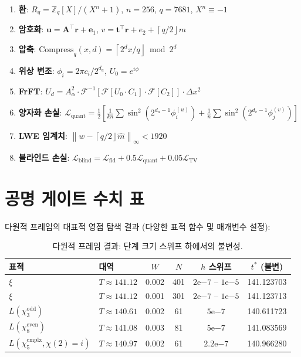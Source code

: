\documentclass[11pt, a4paper]{article}
\theoremstyle{definition}
\theoremstyle{plain}
\newcommand{\Rq}{\mathbb{Z}_q[X]/(X^n+1)}
\newcommand{\norm}[1]{\left\|#1\right\|}
\newcommand{\ceil}[1]{\left\lceil#1\right\rfloor}
\newcommand{\xif}{\xi}
\begin{document}
\begin{enumerate}
  \item \textbf{환}: $R_q = \Rq$, $n=256$, $q=7681$, $X^n \equiv -1$
  \item \textbf{암호화}: $\mathbf{u} = \mathbf{A}^\top\mathbf{r}+\mathbf{e}_1$,
        $v = \mathbf{t}^\top\mathbf{r}+e_2+\ceil{q/2}m$
  \item \textbf{압축}: $\mathrm{Compress}_q(x,d) = \ceil{2^d x/q} \bmod 2^d$
  \item \textbf{위상 변조}: $\phi_i = 2\pi c_i/2^{d_u}$,
        $U_0 = e^{i\phi}$
  \item \textbf{FrFT}: $U_d = A_\alpha^2 \cdot \mathcal{F}^{-1}[\mathcal{F}[U_0 \cdot C_1] \cdot \mathcal{F}[C_2]] \cdot \Delta x^2$
  \item \textbf{양자화 손실}: $\mathcal{L}_{\mathrm{quant}} = \frac{1}{2}[\frac{1}{kn}\sum\sin^2(2^{d_u-1}\phi_i^{(u)}) + \frac{1}{n}\sum\sin^2(2^{d_v-1}\phi_j^{(v)})]$
  \item \textbf{LWE 임계치}: $\norm{w - \ceil{q/2}\hat{m}}_\infty < 1920$
  \item \textbf{블라인드 손실}: $\mathcal{L}_{\mathrm{blind}} = \mathcal{L}_{\mathrm{fid}} + 0.5\mathcal{L}_{\mathrm{quant}} + 0.05\mathcal{L}_{\mathrm{TV}}$
\end{enumerate}


\section{공명 게이트 수치 표}
\label{app:numerical}

다원적 프레임의 대표적 영점 탐색 결과 (다양한 표적 함수 및 매개변수 설정):

\begin{table}[ht]
\centering
\caption{다원적 프레임 결과: 단계 크기 스위프 하에서의 불변성.}
\label{tab:polyadic_sweep}
\small
\begin{tabular}{@{} llcccc @{}}
\toprule
\textbf{표적} & \textbf{대역} & $W$ & $N$ & $h$ 스위프
& $t^*$ (불변) \\
\midrule
$\xif$ & $T\approx141.12$ & 0.002 & 401 &
$2\mathrm{e}{-7}$ -- $1\mathrm{e}{-5}$ & 141.123703 \\
$\xif$ & $T\approx141.12$ & 0.001 & 301 &
$2\mathrm{e}{-7}$ -- $1\mathrm{e}{-5}$ & 141.123713 \\
$L(\chi_3^{\mathrm{odd}})$ & $T\approx140.61$ & 0.002 & 61 &
$5\mathrm{e}{-7}$ & 140.611723 \\
$L(\chi_8^{\mathrm{even}})$ & $T\approx141.08$ & 0.003 & 81 &
$5\mathrm{e}{-7}$ & 141.083569 \\
$L(\chi_5^{\mathrm{cmplx}}, \chi(2)=i)$ & $T\approx140.97$ & 0.002 & 61 &
$2.2\mathrm{e}{-7}$ & 140.966280 \\
\bottomrule
\end{tabular}
\end{table}
\end{document}
